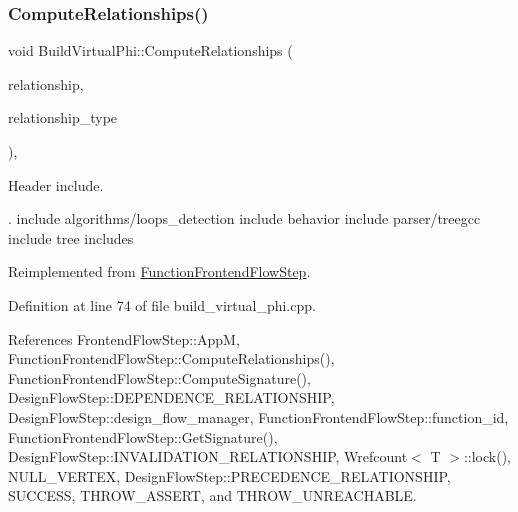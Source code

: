 \mbox{\label{classBuildVirtualPhi_a91ad5ae49dfe85e06f47e88df0dab90d}} 
\subsubsection{\texorpdfstring{Compute\+Relationships()}{ComputeRelationships()}}
{\footnotesize\ttfamily void Build\+Virtual\+Phi\+::\+Compute\+Relationships (\begin{DoxyParamCaption}\item[{\hyperlink{classDesignFlowStepSet}{Design\+Flow\+Step\+Set} \&}]{relationship,  }\item[{const \hyperlink{classDesignFlowStep_a723a3baf19ff2ceb77bc13e099d0b1b7}{Design\+Flow\+Step\+::\+Relationship\+Type}}]{relationship\+\_\+type }\end{DoxyParamCaption})\hspace{0.3cm}{\ttfamily [override]}, {\ttfamily [virtual]}}



Header include. 

. include algorithms/loops\+\_\+detection include behavior include parser/treegcc include tree includes 

Reimplemented from \hyperlink{classFunctionFrontendFlowStep_a1a815ea7885f3e92e414dadd40c43cba}{Function\+Frontend\+Flow\+Step}.



Definition at line 74 of file build\+\_\+virtual\+\_\+phi.\+cpp.



References Frontend\+Flow\+Step\+::\+AppM, Function\+Frontend\+Flow\+Step\+::\+Compute\+Relationships(), Function\+Frontend\+Flow\+Step\+::\+Compute\+Signature(), Design\+Flow\+Step\+::\+D\+E\+P\+E\+N\+D\+E\+N\+C\+E\+\_\+\+R\+E\+L\+A\+T\+I\+O\+N\+S\+H\+IP, Design\+Flow\+Step\+::design\+\_\+flow\+\_\+manager, Function\+Frontend\+Flow\+Step\+::function\+\_\+id, Function\+Frontend\+Flow\+Step\+::\+Get\+Signature(), Design\+Flow\+Step\+::\+I\+N\+V\+A\+L\+I\+D\+A\+T\+I\+O\+N\+\_\+\+R\+E\+L\+A\+T\+I\+O\+N\+S\+H\+IP, Wrefcount$<$ T $>$\+::lock(), N\+U\+L\+L\+\_\+\+V\+E\+R\+T\+EX, Design\+Flow\+Step\+::\+P\+R\+E\+C\+E\+D\+E\+N\+C\+E\+\_\+\+R\+E\+L\+A\+T\+I\+O\+N\+S\+H\+IP, S\+U\+C\+C\+E\+SS, T\+H\+R\+O\+W\+\_\+\+A\+S\+S\+E\+RT, and T\+H\+R\+O\+W\+\_\+\+U\+N\+R\+E\+A\+C\+H\+A\+B\+LE.

